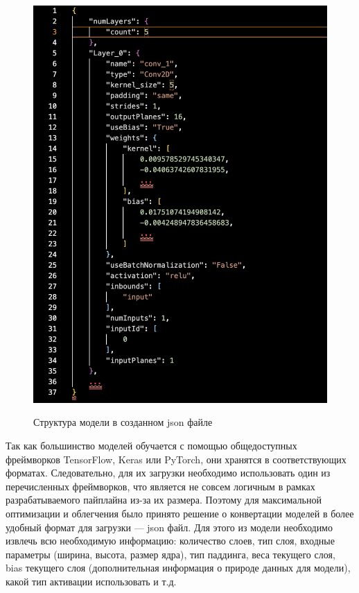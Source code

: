 \documentclass[a4paper,14pt]{extreport}
\begin{document}
\begin{figure}[!h]
\begin{center}
\begin{minipage}[!h]{0.39\linewidth}
                        \includegraphics[width=1\linewidth]{images-pipeline/json.png}
                        \label{ris:netron}
                        \caption{Структура модели в созданном json файле} 
                    \end{minipage}
                \end{center}
            \end{figure}
            
            Так как большинство моделей обучается с помощью общедоступных фреймворков TensorFlow, Keras или PyTorch, они хранятся в соответствующих форматах. Следовательно, для их загрузки необходимо использовать один из перечисленных фреймворков, что является не совсем логичным в рамках разрабатываемого пайплайна из-за их размера. Поэтому для максимальной оптимизации и облегчения было принято решение о конвертации моделей в более удобный формат для загрузки — json файл. Для этого из модели необходимо извлечь всю необходимую информацию: количество слоев, тип слоя, входные параметры (ширина, высота, размер ядра), тип паддинга, веса текущего слоя, bias текущего слоя (дополнительная информация о природе данных для модели), какой тип активации использовать и т.д.
\end{document}

